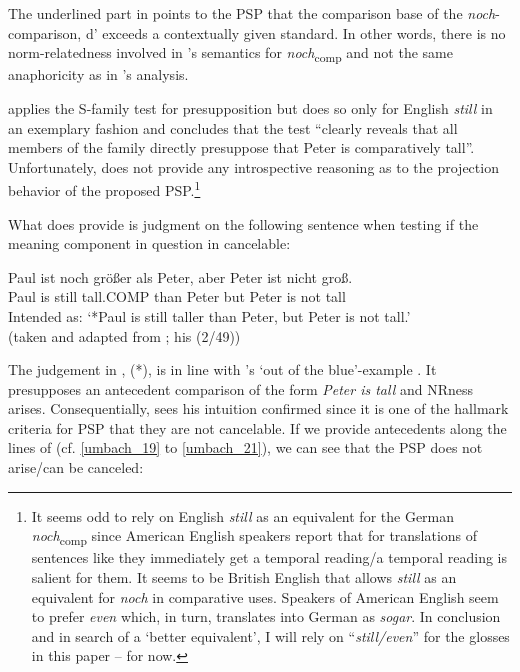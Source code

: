 \documentclass[output=paper,
modfonts
]{langscibook}
\begin{document}
The underlined part in  points to the PSP that the comparison base of the \textit{noch}-comparison, d' exceeds a contextually given standard. In other words, there is no norm-relatedness involved in \citeauthor{Hofstetter2013}'s semantics for \textit{noch}\textsubscript{comp} and not the same anaphoricity as in \citeauthor{umbach2009a_comp}'s \citeyearpar{umbach2009a_comp} analysis.

\citeauthor{Hofstetter2013} applies the S-family test \citep{kadmon2001} for presupposition but does so only for English \textit{still} in an exemplary fashion and concludes that the test ``clearly reveals that all members of the family directly presuppose that Peter is comparatively tall''. Unfortunately, \citeauthor{Hofstetter2013} does not provide any introspective reasoning as to the projection behavior of the proposed PSP.\footnote{ It seems odd to rely on English \textit{still} as an equivalent for the German \textit{noch}\textsubscript{comp} since American English speakers report that for translations of sentences like  they immediately get a temporal reading/a temporal reading is salient for them. It seems to be British English that allows \textit{still} as an equivalent for \textit{noch} in comparative uses. Speakers of American English seem to prefer \textit{even} which, in turn, translates into German as \textit{sogar}. In conclusion and in search of a `better equivalent', I will rely on ``\textit{still\slash even}'' for the glosses in this paper -- for now.}

What \citeauthor{Hofstetter2013} does provide is judgment on the following sentence when testing if the meaning component in question in cancelable:

\ea\gll *Paul ist noch größer als Peter, aber Peter ist nicht groß.\\
       Paul is still tall.COMP than Peter but Peter is not tall\\
\glt   Intended as: {`*Paul is still taller than Peter, but Peter is not tall.'} \\ (taken and adapted from \textcite[p.27]{Hofstetter2013}; his (2/49)) \label{hofstetter_ABER_peter_nicht_gross}
\z

\noindent The judgement in , (*), is in line with \citeauthor{umbach2009a_comp}'s \citeyearpar{umbach2009a_comp} `out of the blue'-example . It presupposes an antecedent comparison of the form \textit{Peter is tall} and NRness arises. Consequentially, \citet{Hofstetter2013} sees his intuition \linebreak confirmed since it is one of the hallmark criteria for PSP that they are not cancelable. If we provide antecedents along the lines of \citeauthor{umbach2009a_comp} (cf. \ref{umbach_19} to \ref{umbach_21}), we can see that the PSP does not arise/can be canceled: 
\end{document}
